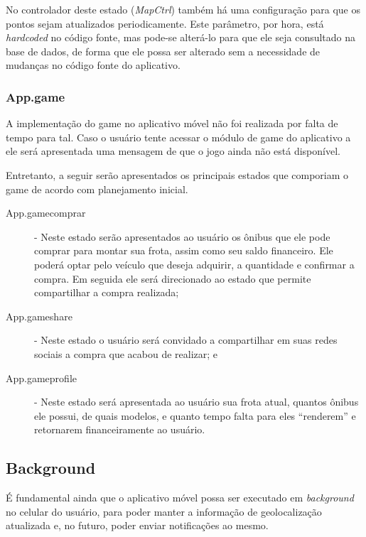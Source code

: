 No controlador deste estado (\textit{MapCtrl}) também há uma configuração para que os pontos sejam atualizados periodicamente. Este parâmetro, por hora, está \textit{hardcoded} no código fonte, mas pode-se alterá-lo para que ele seja consultado na base de dados, de forma que ele possa ser alterado sem a necessidade de mudanças no código fonte do aplicativo.


\subsubsection{App.game}
A implementação do game no aplicativo móvel não foi realizada por falta de tempo para tal. Caso o usuário tente acessar o módulo de game do aplicativo a ele será apresentada uma mensagem de que o jogo ainda não está disponível.

Entretanto, a seguir serão apresentados os principais estados que comporiam o game de acordo com planejamento inicial.
\begin{description}
    \item[App.gamecomprar] - Neste estado serão apresentados ao usuário os ônibus que ele pode comprar para montar sua frota, assim como seu saldo financeiro. Ele poderá optar pelo veículo que deseja adquirir, a quantidade e confirmar a compra. Em seguida ele será direcionado ao estado que permite compartilhar a compra realizada;
    \item[App.gameshare] - Neste estado o usuário será convidado a compartilhar em suas redes sociais a compra que acabou de realizar; e
    \item[App.gameprofile] - Neste estado será apresentada ao usuário sua frota atual, quantos ônibus ele possui, de quais modelos, e quanto tempo falta para eles ``renderem'' e retornarem financeiramente ao usuário.
\end{description}

\subsection{Background}
É fundamental ainda que o aplicativo móvel possa ser executado em \textit{background} no celular do usuário, para poder manter a informação de geolocalização atualizada e, no futuro, poder enviar notificações ao mesmo.

